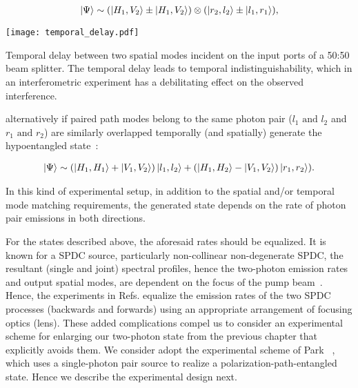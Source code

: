 \begin{align}
	\ket{\Psi} \sim (\ket{H_1,V_2} \pm \ket{H_1,V_2})\otimes(\ket{r_2,l_2} \pm \ket{l_1,r_1}),
\end{align}

\begin{marginfigure}
	\raggedright
	\texttt{[image: temporal\_delay.pdf]}
	\caption[Temporal delay between two spatial modes incident on the input ports of a 50:50 beam splitter.]{Temporal delay between two spatial modes incident on the input ports of a 50:50 beam splitter. The temporal delay leads to temporal indistinguishability, which in an interferometric experiment has a debilitating effect on the observed interference.}
\end{marginfigure}


\noindent
alternatively if paired path modes belong to the same photon pair ($l_1\text{ and }l_2$ and $r_1\text{ and }r_2$) are similarly overlapped temporally (and spatially) generate the hypoentangled state~\cite{Chen_2007}:

\begin{align}
	\ket{\Psi} \sim (\ket{H_1, H_1} + \ket{V_1,V_2})\ket{l_1,l_2} + (\ket{H_1, H_2} - \ket{V_1,V_2})\ket{r_1,r_2}).
\end{align}


\noindent
In this kind of experimental setup, in addition to the spatial and/or temporal mode matching requirements, the generated state depends on the rate of photon pair emissions in both directions.


\clearpage
\noindent
For the states described above, the aforesaid rates should be equalized. It is known for a \acs{SPDC} source, particularly non-collinear non-degenerate \acs{SPDC}, the resultant (single and joint) spectral profiles, hence the two-photon emission rates and output spatial modes, are dependent on the focus of the pump beam~\cite{Carrasco_2006}. Hence, the experiments in Refs.\cite{Yang_2005, Chen_2007} equalize the emission rates of the two \acs{SPDC} processes (backwards and forwards) using an appropriate arrangement of focusing optics (\ie lens). These added complications compel us to consider an experimental scheme for enlarging our two-photon state from the previous chapter that explicitly avoids them. We consider adopt the experimental scheme of Park \etal~\cite{Park_2007}, which uses a single-photon pair source to realize a polarization-path-entangled state. Hence we describe the experimental design next.

